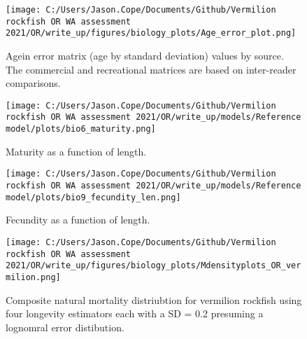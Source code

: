 \documentclass[11pt,
  english,
  a4paper,
]{article}
\begin{document}
\tagmcend\tagstructend


\begin{figure}
\centering
\texttt{[image: C:/Users/Jason.Cope/Documents/Github/Vermilion rockfish OR WA assessment 2021/OR/write\_up/figures/biology\_plots/Age\_error\_plot.png]}
\caption{Agein error matrix (age by standard deviation) values by source. The commercial and recreational matrices are based on inter-reader comparisons.\label{fig:age-error}}
\end{figure}

\tagmcend\tagstructend


\begin{figure}
\centering
\texttt{[image: C:/Users/Jason.Cope/Documents/Github/Vermilion rockfish OR WA assessment 2021/OR/write\_up/models/Reference model/plots/bio6\_maturity.png]}
\caption{Maturity as a function of length.\label{fig:maturity}}
\end{figure}

\tagmcend\tagstructend


\begin{figure}
\centering
\texttt{[image: C:/Users/Jason.Cope/Documents/Github/Vermilion rockfish OR WA assessment 2021/OR/write\_up/models/Reference model/plots/bio9\_fecundity\_len.png]}
\caption{Fecundity as a function of length.\label{fig:fecundity}}
\end{figure}

\tagmcend\tagstructend


\begin{figure}
\centering
\texttt{[image: C:/Users/Jason.Cope/Documents/Github/Vermilion rockfish OR WA assessment 2021/OR/write\_up/figures/biology\_plots/Mdensityplots\_OR\_vermilion.png]}
\caption{Composite natural mortality distriubtion for vermilion rockfish using four longevity estimators each with a SD = 0.2 presuming a lognomral error distibution.\label{fig:M_composite_dists}}
\end{figure}
\end{document}
